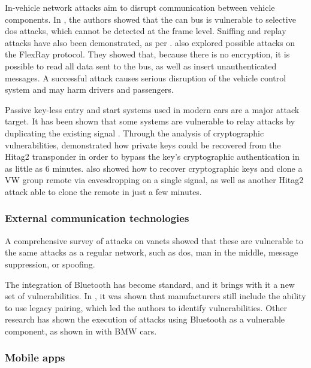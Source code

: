 In-vehicle network attacks aim to disrupt communication between vehicle components. In \citep{Palanca2017}, the authors showed that the \gls{can} bus is vulnerable to selective \gls{dos} attacks, which cannot be detected at the frame level. Sniffing and replay attacks have also been demonstrated, as per \cite{hoppe2009applying}. \cite{nilsson2009first} also explored possible attacks on the FlexRay protocol. They showed that, because there is no encryption, it is possible to read all data sent to the bus, as well as insert unauthenticated messages. A successful attack causes serious disruption of the vehicle control system and may harm drivers and passengers.\par

Passive key-less entry and start systems used in modern cars are a major attack target. It has been shown that some systems are vulnerable to relay attacks by duplicating the existing signal \citep{francillon2011relay}. Through the analysis of cryptographic vulnerabilities, \cite{verdult2012gone} demonstrated how private keys could be recovered from the Hitag2 transponder in order to bypass the key's cryptographic authentication in as little as 6 minutes. \cite{garcia2016lock} also showed how to recover cryptographic keys and clone a VW group remote via eavesdropping on a single signal, as well as another Hitag2 attack able to clone the remote in just a few minutes.\par

\subsubsection{External communication technologies}

A comprehensive survey of attacks on \glspl{vanet} \cite{Hasrouny2017} showed that these are vulnerable to the same attacks as a regular network, such as \gls{dos}, man in the middle, message suppression, or spoofing.\par

The integration of Bluetooth has become standard, and it brings with it a new set of vulnerabilities. In \cite{Cheah2017}, it was shown that manufacturers still include the ability to use legacy pairing, which led the authors to identify vulnerabilities. Other research has shown the execution of attacks using Bluetooth as a vulnerable component, as shown in \cite{Cai2019} with BMW cars.

\subsubsection{Mobile apps}

